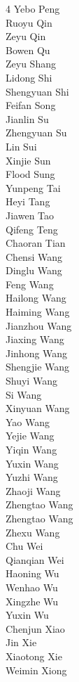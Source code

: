 \begin{multicols}{4}
Yebo Peng\\
Ruoyu Qin\\
Zeyu Qin\\
Bowen Qu\\
Zeyu Shang\\
Lidong Shi\\
Shengyuan Shi\\
Feifan Song\\
Jianlin Su\\
Zhengyuan Su\\
Lin Sui\\
Xinjie Sun\\
Flood Sung\\
Yunpeng Tai\\
Heyi Tang\\
Jiawen Tao\\
Qifeng Teng\\
Chaoran Tian\\
Chensi Wang\\
Dinglu Wang\\
Feng Wang\\
Hailong Wang\\
Haiming Wang\\
Jianzhou Wang\\
Jiaxing Wang\\
Jinhong Wang\\
Shengjie Wang\\
Shuyi Wang\\
Si Wang\\
Xinyuan Wang\\
Yao Wang\\
Yejie Wang\\
Yiqin Wang\\
Yuxin Wang\\
Yuzhi Wang\\
Zhaoji Wang\\
Zhengtao Wang\\
Zhengtao Wang\\
Zhexu Wang\\
Chu Wei\\
Qianqian Wei\\
Haoning Wu\\
Wenhao Wu\\
Xingzhe Wu\\
Yuxin Wu\\
Chenjun Xiao\\
Jin Xie\\
Xiaotong Xie\\
Weimin Xiong\\

\end{multicols}
